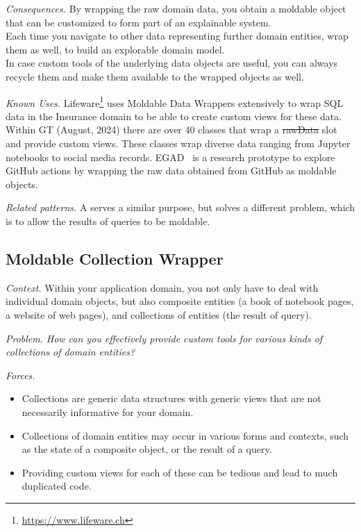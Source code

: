 \documentclass[acmsmall,screen,authorversion,nonacm]{acmart} %
\newcommand{\pattern}[2]{\needlines{10}
\subsection*{#1}\label{pat:#2}}
\newcommand{\patref}[1]{\emph{\nameref{pat:#1}}\xspace}
\newcommand{\patsec}[1]{\noindent\textit{#1.}\xspace}
\begin{document}
\patsec{Consequences}
By wrapping the raw domain data, you obtain a moldable object that can be customized to form part of an explainable system.\\
Each time you navigate to other data representing further domain entities, wrap them as well, to build an explorable domain model.\\
In case custom tools of the underlying data objects are useful, you can always recycle them and make them available to the wrapped objects as well.

\patsec{Known Uses}
Lifeware\footnote{\url{https://www.lifeware.ch}} uses Moldable Data Wrappers extensively to wrap SQL data in the Insurance domain to be able to create custom views for these data.
Within GT (August, 2024) there are over 40 classes that wrap a \st{rawData} slot and provide custom views.
These classes wrap diverse data ranging from Jupyter notebooks to social media records.
EGAD~\cite{Vale23a} is a research prototype to explore GitHub actions by wrapping the raw data obtained from GitHub as moldable objects.

\patsec{Related patterns}
A \patref{CollectionWrapper} serves a similar purpose, but solves a different problem, which is to allow the results of queries to be moldable.

\pattern{Moldable Collection Wrapper}{CollectionWrapper}

\patsec{Context}
Within your application domain, you not only have to deal with individual domain objects, but also composite entities (\eg a book of notebook pages, a website of web pages), and collections of entities (\eg the result of query).

\patsec{Problem}
\emph{How can you effectively provide custom tools for various kinds of collections of domain entities?}

\patsec{Forces}
\begin{itemize}[---]
\item Collections are generic data structures with generic views that are not necessarily informative for your domain.
\item Collections of domain entities may occur in various forms and contexts, such as the state of a composite object, or the result of a query.
\item Providing custom views for each of these can be tedious and lead to much duplicated code.
\end{itemize}
\end{document}
